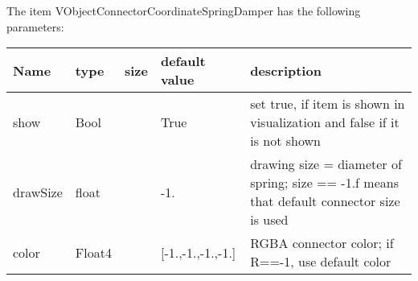 The item VObjectConnectorCoordinateSpringDamper has the following parameters:\vspace{-1cm}\\ 
\begin{center}
  \footnotesize
  \begin{longtable}{| p{4.5cm} | p{2.5cm} | p{0.5cm} | p{2.5cm} | p{6cm} |}
    \hline
    \bf Name & \bf type & \bf size & \bf default value & \bf description \\ \hline
    show &     Bool &      &     True &     set true, if item is shown in visualization and false if it is not shown\\ \hline
    drawSize &     float &      &     -1. &     drawing size = diameter of spring; size == -1.f means that default connector size is used\\ \hline
    color &     Float4 &      &     [-1.,-1.,-1.,-1.] &     RGBA connector color; if R==-1, use default color\\ \hline
	  \end{longtable}
	\end{center}


